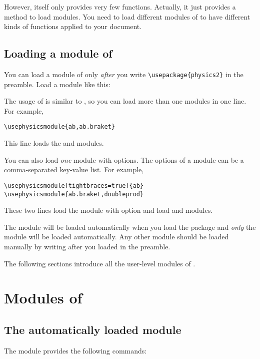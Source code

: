 \documentclass[11pt,letterpaper]{article}
\begin{document}
However,  itself only provides very few functions. Actually, it
just provides a method to load modules. You need to load different modules of
 to have different kinds of functions applied to your document.

\subsection{Loading a module of }
You can load a module of  only \emph{after} you write
\verb|\usepackage{physics2}| in the preamble. Load a  module
like this:
\begin{center}
\end{center}
The usage of  is similar to , so you can
load more than one modules in one line. For example,
\begin{Verbatim}
\usephysicsmodule{ab,ab.braket}
\end{Verbatim}
This line loads the  and  modules.

You can also load \emph{one} module with options. The options of a
 module can be a comma-separated key-value list. For example,
\begin{Verbatim}
\usephysicsmodule[tightbraces=true]{ab}
\usephysicsmodule{ab.braket,doubleprod}
\end{Verbatim}
These two lines load the  module with option
 and load  and 
modules.

\pardanger
The  module will be loaded automatically when you load the
 package and \emph{only} the  module will be
loaded automatically. Any other module should be loaded manually by writing
 after you loaded  in the
preamble.

The following sections introduce all the user-level modules of .

\section{Modules of }
\subsection{The automatically loaded  module}
The  module provides the following commands:
\end{document}
